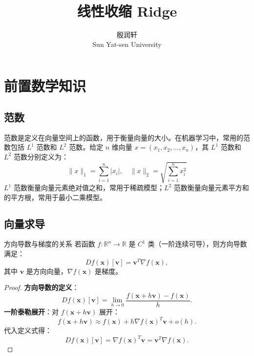 \documentclass[lang=cn,11pt,a4paper]{elegantpaper}
\title{线性收缩 Ridge}
\author{ 殷润轩   \\ Sun Yat-sen University }
\institute{数学学院（珠海） \LaTeX{} }
\date{\zhtoday}
\begin{document}
\maketitle
\begin{abstract}

\end{abstract}
\section{前置数学知识}
\subsection{范数}
范数是定义在向量空间上的函数，用于衡量向量的大小。在机器学习中，常用的范数包括 \( L^1 \) 范数和 \( L^2 \) 范数。给定 \( n \) 维向量 \( x = (x_1, x_2, \dots, x_n) \)，其 \( L^1 \) 范数和 \( L^2 \) 范数分别定义为：
\begin{equation}
\| x \|_1 = \sum_{i=1}^n |x_i|, \quad \| x \|_2 = \sqrt{\sum_{i=1}^n x_i^2}
\end{equation}
\( L^1 \) 范数衡量向量元素绝对值之和，常用于稀疏模型；\( L^2 \) 范数衡量向量元素平方和的平方根，常用于最小二乘模型。
\subsection{向量求导}

\begin{theorem}{方向导数与梯度的关系}
    若函数 \( f: \mathbb{R}^n \to \mathbb{R} \) 是 \( C^1 \) 类（一阶连续可导），则方向导数满足：
    \begin{equation}
    Df(\mathbf{x})[\mathbf{v}] = \mathbf{v}^T \nabla f(\mathbf{x}),
    \end{equation}
    其中 \( \mathbf{v} \) 是方向向量，\( \nabla f(\mathbf{x}) \) 是梯度。
\end{theorem}
\begin{proof}
        \textbf{方向导数的定义}：
        \begin{equation}
        Df(\mathbf{x})[\mathbf{v}] = \lim_{h \to 0} \frac{f(\mathbf{x} + h\mathbf{v}) - f(\mathbf{x})}{h}.
        \end{equation}
        \textbf{一阶泰勒展开}：对 \( f(\mathbf{x} + h\mathbf{v}) \) 展开：
        \begin{equation}
        f(\mathbf{x} + h\mathbf{v}) \approx f(\mathbf{x}) + h \nabla f(\mathbf{x})^T \mathbf{v} + o(h).
    \end{equation}
        代入定义式得：
        \begin{equation}
        Df(\mathbf{x})[\mathbf{v}] = \nabla f(\mathbf{x})^T \mathbf{v} =\mathbf{v}^T \nabla f(\mathbf{x}).
    \end{equation}
\end{proof}
\end{document}
